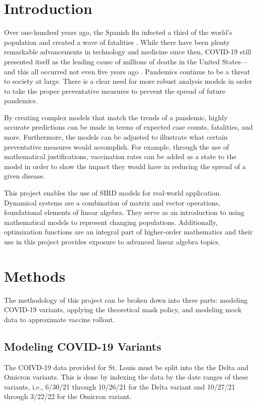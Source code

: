\documentclass[conference]{IEEEtran}
\begin{document}
\section{Introduction}
Over one-hundred years ago, the Spanish flu infected a third of the world's population and created a wave of fatalities \cite{spanishflu}. While there have been plenty remarkable advancements in technology and medicine since then, COVID-19 still presented itself as the leading cause of millions of deaths in the United States—and this all occurred not even five years ago \cite{b1}. Pandemics continue to be a threat to society at large. There is a clear need for more robust analysis models in order to take the proper preventative measures to prevent the spread of future pandemics.

By creating complex models that match the trends of a pandemic, highly accurate predictions can be made in terms of expected case counts, fatalities, and more. Furthermore, the models can be adjusted to illustrate what certain preventative measures would accomplish. For example, through the use of mathematical justifications, vaccination rates can be added as a state to the model in order to show the impact they would have in reducing the spread of a given disease.

This project enables the use of SIRD models for real-world application. Dynamical systems are a combination of matrix and vector operations, foundational elements of linear algebra. They serve as an introduction to using mathematical models to represent changing populations. Additionally, optimization functions are an integral part of higher-order mathematics and their use in this project provides exposure to advanced linear algebra topics.

\section{Methods}
The methodology of this project can be broken down into three parts: modeling COVID-19 variants, applying the theoretical mask policy, and modeling mock data to approximate vaccine rollout.

\subsection{Modeling COVID-19 Variants}
The COIVD-19 data provided for St. Louis must be split into the the Delta and Omicron variants. This is done by indexing the data by the date ranges of these variants, i.e., 6/30/21 through 10/26/21 for the Delta variant and 10/27/21 through 3/22/22 for the Omicron variant.
\end{document}
